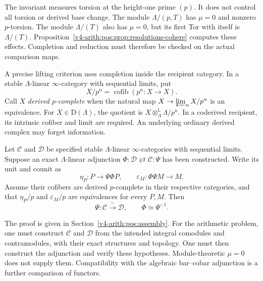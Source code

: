 \begin{remark}[the role of \(\mu=0\)]
\label{v4-arith:pos:rem:why-mu-zero}
The invariant measures torsion at the height-one prime \((p)\).
It does not control all torsion or derived base change.
The module \(\Lambda/(p,T)\) has \(\mu=0\) and nonzero
\(p\)-torsion. The module \(\Lambda/(T)\) also has \(\mu=0\),
but its first Tor with itself is \(\Lambda/(T)\).
Proposition~\ref{v4-arith:pos:prop:resolutions-cohere} computes
these effects. Completion and reduction must therefore be
checked on the actual comparison maps.
\end{remark}

A precise lifting criterion uses completion inside the recipient
category. In a stable \(\Lambda\)-linear \(\infty\)-category with
sequential limits, put
\[
 X/p^n=\operatorname{cofib}(p^n:X\to X).
\]
Call \(X\) \emph{derived \(p\)-complete} when the natural map
\(X\to\varprojlim_n X/p^n\) is an equivalence.
For \(X\in\mathrm D(\Lambda)\), the quotient is
\(X\otimes_\Lambda^{\mathbb L}\Lambda/p^n\).
In a coderived recipient, its intrinsic cofiber and limit are
required. An underlying ordinary derived complex may forget
information.

\begin{theorem}
\label{v4-arith:thm:arithmetic-positselski}
Let \(\mathcal C\) and \(\mathcal D\) be specified stable
\(\Lambda\)-linear \(\infty\)-categories with sequential limits.
Suppose an exact \(\Lambda\)-linear adjunction
\(\Phi:\mathcal D\rightleftarrows\mathcal C:\Psi\) has been
constructed. Write its unit and counit as
\[
 \eta_P:P\longrightarrow\Psi\Phi P,
 \qquad
 \varepsilon_M:\Phi\Psi M\longrightarrow M.
\]
Assume their cofibers are derived \(p\)-complete in their
respective categories, and that \(\eta_P/p\) and
\(\varepsilon_M/p\) are equivalences for every \(P,M\).
Then
\begin{equation}
\label{v4-arith:pos:eq:arith-positselski}
 \Psi:\mathcal C\xrightarrow{\ \sim\ }\mathcal D,
 \qquad \Phi\simeq\Psi^{-1}.
\end{equation}
\end{theorem}

The proof is given in Section~\ref{v4-arith:pos:assembly}.
For the arithmetic problem, one must construct \(\mathcal C\)
and \(\mathcal D\) from the intended integral comodules and
contramodules, with their exact structures and topology.
One must then construct the adjunction and verify these
hypotheses. Module-theoretic \(\mu=0\) does not supply them.
Compatibility with the algebraic bar--cobar adjunction is a
further comparison of functors.

